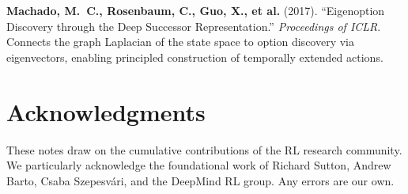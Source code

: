\documentclass[11pt,a4paper]{article}
\begin{document}
\begin{enumerate}[label={[\arabic*]}, leftmargin=*, itemsep=6pt]
\item \textbf{Machado, M.~C., Rosenbaum, C., Guo, X., et al.} (2017).
  ``Eigenoption Discovery through the Deep Successor Representation.''
  \textit{Proceedings of ICLR}. \\
  Connects the graph Laplacian of the state space to option discovery via
  eigenvectors, enabling principled construction of temporally extended actions.

\end{enumerate}


\section*{Acknowledgments}

These notes draw on the cumulative contributions of the RL research community.
We particularly acknowledge the foundational work of Richard Sutton, Andrew Barto,
Csaba Szepesv\'ari, and the DeepMind RL group. Any errors are our own.
\end{document}
